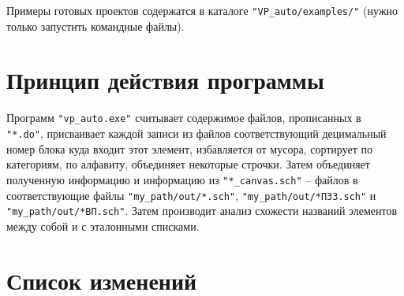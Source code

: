 Примеры готовых проектов содержатся в каталоге \verb|"VP_auto/examples/"| (нужно только запустить командные файлы).


\section{Принцип действия программы}

Программ \verb|"vp_auto.exe"| считывает содержимое файлов, прописанных в \\ \verb|"*.do"|, присваивает каждой записи из файлов соответствующий децимальный номер блока куда входит этот элемент, избавляется от мусора, сортирует по категориям, по алфавиту, объединяет некоторые строчки. Затем объединяет полученную информацию и информацию из \verb|"*_canvas.sch"| -- файлов в соответствующие файлы \verb|"my_path/out/*.sch"|, \verb|"my_path/out/*ПЗ3.sch"| и \verb|"my_path/out/*ВП.sch"|. Затем производит анализ схожести названий элементов между собой и с эталонными списками.


\section{Список изменений}

